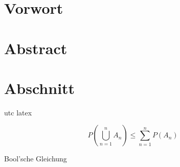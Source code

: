 








\blankpage


\setcounter{page}{-1}
\thispagestyle{empty}



\clearpage



\section*{Vorwort}

\clearpage



\section*{Abstract}

\clearpage






\section{Abschnitt}\label{sec:first}
\lipsum[]\cite{biblatex}
\acrshort{utc}
\gls{latex}
\begin{mycapequ}[!ht]
    \begin{equation}
        {P(\bigcup_{n=1}^n A_n) \leq \sum_{n=1}^n P(A_n)}
        \label{eq:bool1} %
    \end{equation}
    \caption{Bool'sche Gleichung}
\end{mycapequ}

